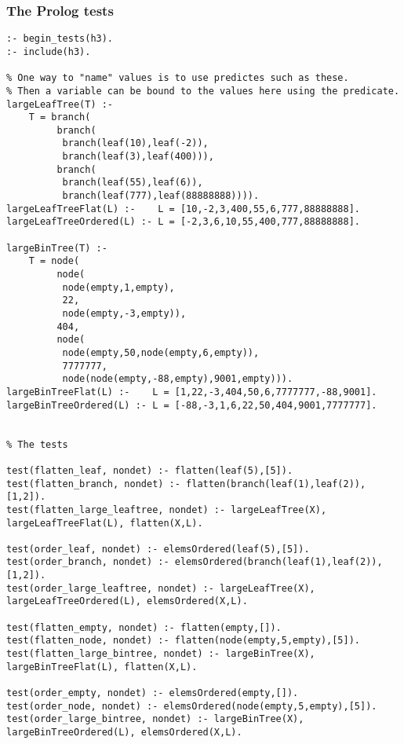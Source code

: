 \documentclass[11pt]{article}
\begin{document}
\subsubsection*{The Prolog tests}
\label{sec:org7bb561a}
\begin{verbatim}
:- begin_tests(h3).
:- include(h3).

% One way to "name" values is to use predictes such as these.
% Then a variable can be bound to the values here using the predicate.
largeLeafTree(T) :-
    T = branch(
         branch(
          branch(leaf(10),leaf(-2)),
          branch(leaf(3),leaf(400))),
         branch(
          branch(leaf(55),leaf(6)),
          branch(leaf(777),leaf(88888888)))).
largeLeafTreeFlat(L) :-    L = [10,-2,3,400,55,6,777,88888888].
largeLeafTreeOrdered(L) :- L = [-2,3,6,10,55,400,777,88888888].

largeBinTree(T) :-
    T = node(
         node(
          node(empty,1,empty),
          22,
          node(empty,-3,empty)),
         404,     
         node(
          node(empty,50,node(empty,6,empty)),
          7777777,
          node(node(empty,-88,empty),9001,empty))).
largeBinTreeFlat(L) :-    L = [1,22,-3,404,50,6,7777777,-88,9001].
largeBinTreeOrdered(L) :- L = [-88,-3,1,6,22,50,404,9001,7777777].


% The tests

test(flatten_leaf, nondet) :- flatten(leaf(5),[5]).
test(flatten_branch, nondet) :- flatten(branch(leaf(1),leaf(2)),[1,2]).
test(flatten_large_leaftree, nondet) :- largeLeafTree(X), largeLeafTreeFlat(L), flatten(X,L).

test(order_leaf, nondet) :- elemsOrdered(leaf(5),[5]).
test(order_branch, nondet) :- elemsOrdered(branch(leaf(1),leaf(2)),[1,2]).
test(order_large_leaftree, nondet) :- largeLeafTree(X), largeLeafTreeOrdered(L), elemsOrdered(X,L).

test(flatten_empty, nondet) :- flatten(empty,[]).
test(flatten_node, nondet) :- flatten(node(empty,5,empty),[5]).
test(flatten_large_bintree, nondet) :- largeBinTree(X), largeBinTreeFlat(L), flatten(X,L).

test(order_empty, nondet) :- elemsOrdered(empty,[]).
test(order_node, nondet) :- elemsOrdered(node(empty,5,empty),[5]).
test(order_large_bintree, nondet) :- largeBinTree(X), largeBinTreeOrdered(L), elemsOrdered(X,L).
\end{verbatim}
\end{document}
